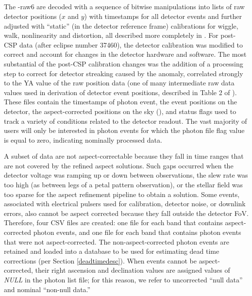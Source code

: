 \documentclass[trackchanges,preprint2]{aastex}
\begin{document}
\subsection{}
The -raw6 are decoded with a sequence of bitwise manipulations into lists of raw detector positions ($x$ and $y$) with timestamps for all detector events and further adjusted with ``static'' (in the detector reference frame) calibrations for wiggle, walk, nonlinearity and distortion, all described more completely in \citet{mor2007}. For post-CSP data (after eclipse number 37460), the detector calibration was modified to correct and account for changes in the detector hardware and software. The most substantial of the post-CSP calibration changes was the addition of a processing step to correct for detector streaking caused by the anomaly, correlated strongly to the YA value of the raw position data (one of many intermediate raw data values used in derivation of detector event positions, described in Table 2 of \citet{mor2007}).  These files contain the timestamps of photon event, the event positions on the detector, the aspect-corrected positions on the sky (), and status flags used to track a variety of conditions related to the detector readout. The vast majority of users will only be interested in photon events for which the photon file flag value is equal to zero, indicating nominally processed data.

A subset of data are not aspect-correctable because they fall in time ranges that are not covered by the refined aspect solutions. Such gaps occurred when the detector voltage was ramping up or down between observations, the slew rate was too high (as between legs of a petal pattern observation), or the stellar field was too sparse for the aspect refinement pipeline to obtain a solution. Some events, associated with electrical pulsers used for calibration, detector noise, or downlink errors, also cannot be aspect corrected because they fall outside the detector FoV. Therefore, four CSV files are created: one file for each band that contains aspect-corrected photon events, and one file for each band that contains photon events that were not aspect-corrected. The non-aspect-corrected photon events are retained and loaded into a database to be used for estimating dead time corrections (per Section \ref{deadtimedesc}). When events cannot be aspect-corrected, their right ascension and declination values are assigned values of \emph{NULL} in the photon list file; for this reason, we refer to uncorrected ``null data'' and nominal ``non-null data.''
\end{document}
